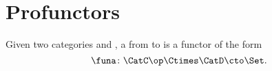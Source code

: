 

\section{Profunctors}

\begin{ctdefinition}[Profunctor]
  \label{def:profunctor}
  Given two categories \CatC and \CatD, a \emph{} from \CatC to \CatD is a functor of the form
  \begin{equation}
    \funa\colon \CatC\op \Ctimes \CatD \cto \Set.
  \end{equation}
\end{ctdefinition}

